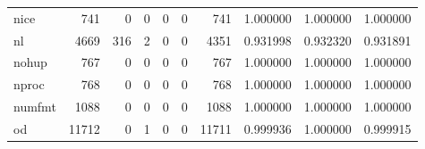 \begin{longtable}{lrrrrrrrrr}
nice      &                                                741 &                                                  0 &                                                  0 &                                                  0 &                                                  0 &                                                741 &                                           1.000000 &                               1.000000 &                             1.000000 \\
nl        &                                               4669 &                                                316 &                                                  2 &                                                  0 &                                                  0 &                                               4351 &                                           0.931998 &                               0.932320 &                             0.931891 \\
nohup     &                                                767 &                                                  0 &                                                  0 &                                                  0 &                                                  0 &                                                767 &                                           1.000000 &                               1.000000 &                             1.000000 \\
nproc     &                                                768 &                                                  0 &                                                  0 &                                                  0 &                                                  0 &                                                768 &                                           1.000000 &                               1.000000 &                             1.000000 \\
numfmt    &                                               1088 &                                                  0 &                                                  0 &                                                  0 &                                                  0 &                                               1088 &                                           1.000000 &                               1.000000 &                             1.000000 \\
od        &                                              11712 &                                                  0 &                                                  1 &                                                  0 &                                                  0 &                                              11711 &                                           0.999936 &                               1.000000 &                             0.999915 \\

\end{longtable}
